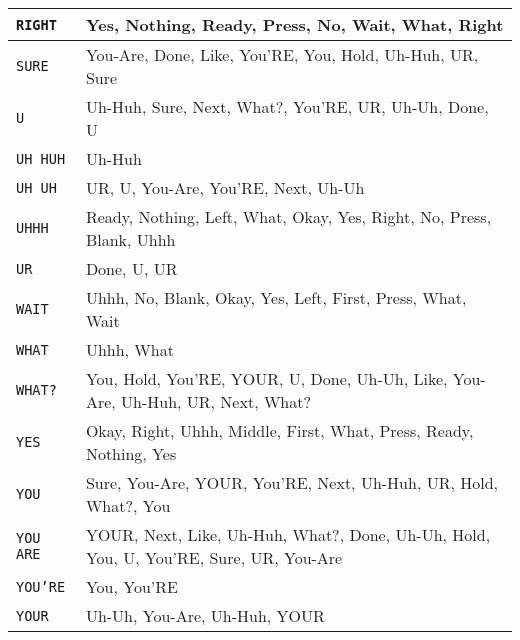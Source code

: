 \documentclass[11pt]{article}
\begin{document}
\begin{multicols}{3}
\begin{tabular}{|l|p{3.75in}|}
                   \hline
\texttt{RIGHT}   & Yes, Nothing, Ready, Press, No, Wait, What, Right \\ \hline
\texttt{SURE}    & You-Are, Done, Like, You'RE, You, Hold, Uh-Huh, UR, Sure \\
                   \hline
\texttt{U}       & Uh-Huh, Sure, Next, What?, You'RE, UR, Uh-Uh, Done, U \\
                   \hline
\texttt{UH HUH}  & Uh-Huh \\ \hline
\texttt{UH UH}   & UR, U, You-Are, You'RE, Next, Uh-Uh \\ \hline
\texttt{UHHH}    & Ready, Nothing, Left, What, Okay, Yes, Right, No, Press,
                   Blank, Uhhh \\ \hline
\texttt{UR}      & Done, U, UR \\ \hline
\texttt{WAIT}    & Uhhh, No, Blank, Okay, Yes, Left, First, Press, What, Wait
                   \\ \hline
\texttt{WHAT}    & Uhhh, What \\ \hline
\texttt{WHAT?}   & You, Hold, You'RE, YOUR, U, Done, Uh-Uh, Like, You-Are,
                   Uh-Huh, UR, Next, What? \\ \hline
\texttt{YES}     & Okay, Right, Uhhh, Middle, First, What, Press, Ready,
                   Nothing, Yes \\ \hline
\texttt{YOU}     & Sure, You-Are, YOUR, You'RE, Next, Uh-Huh, UR, Hold, What?,
                   You \\ \hline
\texttt{YOU ARE} & YOUR, Next, Like, Uh-Huh, What?, Done, Uh-Uh, Hold, You, U,
                   You'RE, Sure, UR, You-Are \\ \hline
\texttt{YOU'RE}  & You, You'RE \\ \hline
\texttt{YOUR}    & Uh-Uh, You-Are, Uh-Huh, YOUR \\ \hline
\end{tabular}

\end{multicols}
\end{document}
